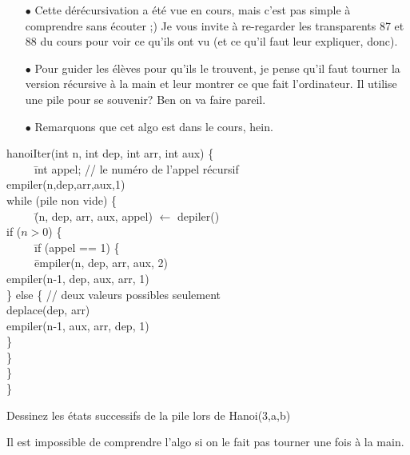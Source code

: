 \documentclass[10pt]{article}\usepackage[correction]{esial}
\begin{document}
\begin{Reponse}
  \begin{itemize}
  \item[$\bullet$] Cette dérécursivation a été vue en cours, mais c'est pas
    simple à comprendre sans écouter ;) Je vous invite à re-regarder les
    transparents 87 et 88 du cours pour voir ce qu'ils ont vu (et ce qu'il faut
    leur expliquer, donc).
  \item[$\bullet$] Pour guider les élèves pour qu'ils le trouvent, je pense
    qu'il faut tourner la version récursive à la main et leur montrer ce que
    fait l'ordinateur. Il utilise une pile pour se souvenir? Ben on va faire
    pareil. 
  \item[$\bullet$] Remarquons que cet algo est dans le cours, hein.
  \end{itemize}\begin{tabbing}
    hanoiIter(int n, int dep, int arr, int aux) \{\\
    ~~~~~\=int appel; // le numéro de l'appel récursif\\
    \>empiler(n,dep,arr,aux,1)\\
    \>while (pile non vide) \{\\
    \>~~~~~\=(n, dep, arr, aux, appel) $\leftarrow$ depiler()\\
    \>\>if ($n>0$) \{\\
    \>\>~~~~~\=if (appel == 1) \{\\
    \>\>\>~~~~~\=empiler(n, dep, arr, aux, 2)\\
    \>\>\>\>empiler(n-1, dep, aux, arr, 1)\\
    \>\>\>\} else \{ // deux valeurs possibles seulement\\
    \>\>\>\>deplace(dep, arr)\\
    \>\>\>\>empiler(n-1, aux, arr, dep, 1)\\
    \>\>\>\}\\
    \>\>\}\\
    \>\}\\
    \}
  \end{tabbing}

\end{Reponse}

\Question Dessinez les états successifs de la pile lors de Hanoi(3,a,b)

\begin{Reponse}
  Il est impossible de comprendre l'algo si on le fait pas
  tourner une fois à la main.  
\end{Reponse}
\end{document}
